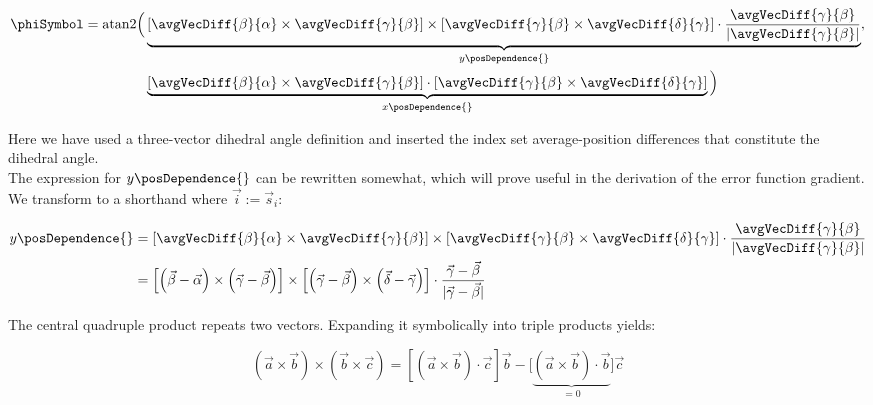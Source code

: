 \begin{align}\begin{aligned}
  \phiSymbol = \textrm{atan2} \Big( &
    \underbrace{
      \left[
        \avgVecDiff{\beta}{\alpha} \times \avgVecDiff{\gamma}{\beta}
      \right] \times \left[
        \avgVecDiff{\gamma}{\beta} \times \avgVecDiff{\delta}{\gamma}
      \right] \cdot \frac{
        \avgVecDiff{\gamma}{\beta}
      }{
        \lvert\avgVecDiff{\gamma}{\beta}\rvert
      }
    }_{y\posDependence{}},\\
    &\underbrace{
      \left[
        \avgVecDiff{\beta}{\alpha} \times \avgVecDiff{\gamma}{\beta}
      \right] \cdot \left[
        \avgVecDiff{\gamma}{\beta} \times \avgVecDiff{\delta}{\gamma}
      \right]
    }_{x\posDependence{}}
  \Big)
\end{aligned}\end{align}

Here we have used a three-vector dihedral angle definition and inserted
the index set average-position differences that constitute the dihedral angle.\\

The expression for $y\posDependence{}$ can be rewritten somewhat, which will
prove useful in the derivation of the error function gradient. We transform to a
shorthand where $\vec{i} := \vec{s}_{i}$:

\begin{align}
  y\posDependence{} &= 
    \left[
      \avgVecDiff{\beta}{\alpha} \times \avgVecDiff{\gamma}{\beta}
    \right] \times \left[
      \avgVecDiff{\gamma}{\beta} \times \avgVecDiff{\delta}{\gamma}
    \right] \cdot \frac{
      \avgVecDiff{\gamma}{\beta}
    }{
      \lvert\avgVecDiff{\gamma}{\beta}\rvert
    }\\
  &= 
    \left[
      \left(\vec{\beta} - \vec{\alpha}\right) 
      \times \left(\vec{\gamma} - \vec{\beta}\right)
    \right] \times \left[
      \left(\vec{\gamma} - \vec{\beta}\right)
      \times \left(\vec{\delta} - \vec{\gamma}\right)
    \right] \cdot \frac{
      \vec{\gamma} - \vec{\beta}
    }{
      \lvert\vec{\gamma} - \vec{\beta}\rvert
    }
\end{align}

The central quadruple product repeats two vectors. Expanding it symbolically
into triple products yields:

\begin{equation}
  \left(\vec{a} \times \vec{b}\right) \times \left(\vec{b} \times \vec{c}\right)
    = \left[\left(\vec{a} \times \vec{b}\right) \cdot \vec{c} \right] \vec{b}
      - \Big[\underbrace{\left(\vec{a} \times \vec{b}\right) \cdot
      \vec{b}}_{=0} \Big] \vec{c}
\end{equation}


